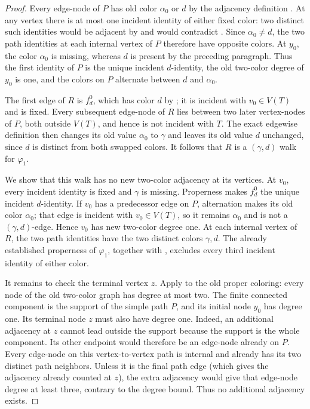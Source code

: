 \begin{proof}
Every edge-node of $P$ has old color $\alpha_0$ or $d$ by the adjacency
definition .  At any vertex there is at
most one incident identity of either fixed color: two distinct such
identities would be adjacent by  and would
contradict .  Since
$\alpha_0\ne d$, the two path identities at each internal vertex of $P$
therefore have opposite colors.  At $y_0$, the color $\alpha_0$ is
missing, whereas $d$ is present by the preceding paragraph.  Thus the
first identity of $P$ is the unique incident $d$-identity, the old
two-color degree of $y_0$ is one, and the colors on $P$ alternate between
$d$ and $\alpha_0$.

The first edge of $R$ is $f^0_d$, which has color $d$ by
; it is incident with $v_0\in V(T)$ and
is fixed.  Every subsequent edge-node of $R$ lies between two later
vertex-nodes of $P$, both outside $V(T)$, and hence is not incident with
$T$.  The exact edgewise definition  then
changes its old value $\alpha_0$ to $\gamma$ and leaves its old value $d$
unchanged, since $d$ is distinct from both swapped colors.  It follows
that $R$ is a $(\gamma,d)$ walk for $\varphi_1$.

We show that this walk has no new two-color adjacency at its vertices.
At $v_0$, every incident identity is fixed and $\gamma$ is missing.
Properness makes $f^0_d$ the unique incident $d$-identity.  If $v_0$ has
a predecessor edge on $P$, alternation makes its old color $\alpha_0$;
that edge is incident with $v_0\in V(T)$, so it remains $\alpha_0$ and is
not a $(\gamma,d)$-edge.  Hence $v_0$ has new two-color degree one.  At
each internal vertex of $R$, the two path identities have the two
distinct colors $\gamma,d$.  The already established properness of
$\varphi_1$, together with , excludes every third
incident identity of either color.

It remains to check the terminal vertex $z$.  Apply
 to the old proper coloring:
every node of the old two-color graph has degree at most two.  The finite
connected component is the support of the simple path $P$, and its
initial node $y_0$ has degree one.  Its terminal node $z$ must also have
degree one.  Indeed, an additional adjacency at $z$ cannot lead outside
the support because the support is the whole component.  Its other endpoint
would therefore be an edge-node already on $P$.  Every edge-node on this
vertex-to-vertex path is internal and already has its two distinct path
neighbors.  Unless it is the final path edge (which gives the adjacency
already counted at $z$), the extra adjacency would give that edge-node
degree at least three, contrary to the degree bound.  Thus no additional
adjacency exists.


\end{proof}
